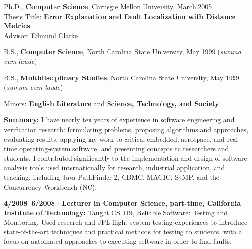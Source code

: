 \documentclass[ComputerScience]{vita}
\begin{document}
\begin{vita}


\begin{Education}
  \item Ph.D., {\bf Computer Science}, Carnegie Mellon University, March 2005\\ Thesis Title:  {\bf Error Explanation and Fault Localization with Distance Metrics}.\\Advisor:  Edmund Clarke

  \item B.S., {\bf Computer Science}, North Carolina State University, May 1999 (\emph{summa cum laude})
  \item B.S., {\bf Multidisciplinary Studies}, North Carolina State University, May 1999 (\emph{summa cum laude})
\item  \hspace{0.5in} Minors:  {\bf English Literature} and {\bf Science, Technology, and Society}
\end{Education}

\begin{Experience}
\item {\bf Summary:} I have nearly ten years of experience in software engineering and verification research: formulating problems, proposing algorithms and
approaches, evaluating results, applying my work to critical embedded,
aerospace, and real-time operating-system software, and presenting
concepts to researchers and students.  I contributed significantly to
the implementation and design of software analysis tools used
internationally for research, industrial application, and teaching,
including Java PathFinder 2, CBMC, MAGIC, SyMP, and the Concurrency
Workbench (NC).

  \item {\bf 4/2008--6/2008 $\cdot$ Lecturer in Computer Science,
  part-time, California Institute of Technology:} Taught CS 119,
  Reliable Software: Testing and Monitoring.  Used research and JPL
  flight system testing experiences to introduce state-of-the-art
  techniques and practical methods for testing to students, with a
  focus on automated approaches to executing software in order to find
  faults.


\end{Experience}
\end{vita}
\end{document}

